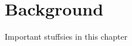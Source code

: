 \setchaptertoc
\chapter{Background}\label{chp:background}

\begin{summary}
Important stuffsies in this chapter
\end{summary}

